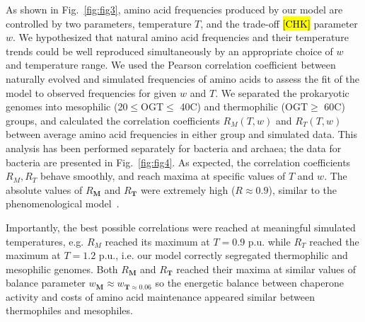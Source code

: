 \documentclass[10pt,letterpaper]{article}
\begin{document}
As shown in Fig.~\ref{fig:fig3}, amino acid frequencies produced by our model are controlled by two parameters, temperature $T$, and the trade-off \hl{[CHK]} parameter $w$. We hypothesized that natural amino acid frequencies and their temperature trends could be well reproduced simultaneously by an appropriate choice of $w$ and temperature range. We used the Pearson correlation coefficient between naturally evolved and simulated frequencies of amino acids to assess the fit of the model to observed frequencies for given $w$ and $T$. We separated the prokaryotic genomes into mesophilic (20$\leq$OGT$\leq$ 40\textdegree C) and thermophilic (OGT$\geq$ 60\textdegree C) groups, and calculated the correlation coefficients $R_M(T,w)$ and $R_T(T,w)$ between average amino acid frequencies in either group and simulated data. This analysis has been performed separately for bacteria and archaea; the data for bacteria are presented in Fig.~\ref{fig:fig4}. As expected, the correlation coefficients $R_M, R_T$ behave smoothly, and reach maxima at specific values of $T$ and $w$. The absolute values of $R_{\mathbf{M}}$ and $R_{\mathbf{T}}$ were extremely high ($R\approx0.9$), similar to the phenomenological model~\cite{Krick2014Amino}. 


Importantly, the best possible correlations were reached at meaningful simulated temperatures, e.g. $R_M$ reached its maximum at $T=0.9$ p.u. while $R_T$ reached the maximum at $T=1.2$ p.u., i.e. our model correctly segregated thermophilic and mesophilic genomes. 
Both $R_{\mathbf{M}}$ and $R_{\mathbf{T}}$ reached their maxima at similar values of balance parameter $w_{\mathbf{M}}\approx w_{\mathbf{T} \approx 0.06}$ so the energetic balance between chaperone activity and costs of amino acid maintenance appeared similar between thermophiles and mesophiles.
\end{document}
